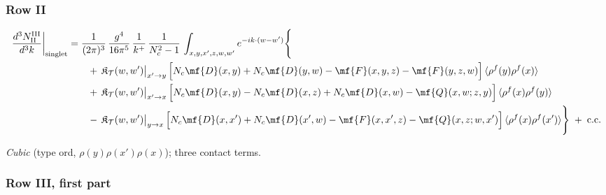\subsubsection*{Row II}

\begin{align}
\frac{d^{3}N^{\rm III}_{\rm II}}{d^{3}k}\bigg|_{\rm singlet}&=\frac{1}{(2\pi)^{3}}\,\frac{g^{4}}{16\pi^{5}}\,\frac{1}{k^{+}}\,\frac{1}{N_{c}^{2}-1}\,\int_{x,y,x',z,w,w'}e^{-ik\cdot(w-w')}\Bigg\{\notag\\
&\qquad +\,\mathfrak{K}_{\mathcal{T}}(w,w')\big|_{x'\to y}\,\Big[N_{c}\mf{D}(x,y)+N_{c}\mf{D}(y,w)-\mf{F}(x,y,z)-\mf{F}(y,z,w)\Big]\,\langle\rho^{f}(y)\rho^{f}(x)\rangle\notag\\
&\qquad +\,\mathfrak{K}_{\mathcal{T}}(w,w')\big|_{x'\to x}\,\Big[N_{c}\mf{D}(x,y)-N_{c}\mf{D}(x,z)+N_{c}\mf{D}(x,w)-\mf{Q}(x,w;z,y)\Big]\,\langle\rho^{f}(x)\rho^{f}(y)\rangle\notag\\
&\qquad -\,\mathfrak{K}_{\mathcal{T}}(w,w')\big|_{y\to x}\,\Big[N_{c}\mf{D}(x,x')+N_{c}\mf{D}(x',w)-\mf{F}(x,x',z)-\mf{Q}(x,z;w,x')\Big]\,\langle\rho^{f}(x)\rho^{f}(x')\rangle\Bigg\}\;+\;{\rm c.c.}\label{eq:s-III-II}
\end{align}

\emph{Cubic} (type ord, $\rho(y)\rho(x')\rho(x)$); three contact terms.
\subsubsection*{Row III, first part}

